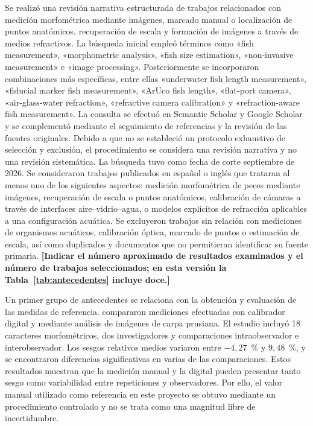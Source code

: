 \documentclass{report}
\newcommand{\pend}[1]{\textbf{[#1]}}
\begin{document}
Se realizó una revisión narrativa estructurada de trabajos relacionados con medición morfométrica mediante imágenes, marcado manual o localización de puntos anatómicos, recuperación de escala y formación de imágenes a través de medios refractivos. La búsqueda inicial empleó términos como «fish measurement», «morphometric analysis», «fish size estimation», «non-invasive measurement» e «image processing». Posteriormente se incorporaron combinaciones más específicas, entre ellas «underwater fish length measurement», «fiducial marker fish measurement», «ArUco fish length», «flat-port camera», «air-glass-water refraction», «refractive camera calibration» y «refraction-aware fish measurement». La consulta se efectuó en Semantic Scholar y Google Scholar y se complementó mediante el seguimiento de referencias y la revisión de las fuentes originales. Debido a que no se estableció un protocolo exhaustivo de selección y exclusión, el procedimiento se considera una revisión narrativa y no una revisión sistemática. La búsqueda tuvo como fecha de corte septiembre de 2026. Se consideraron trabajos publicados en español o inglés que trataran al menos uno de los siguientes aspectos: medición morfométrica de peces mediante imágenes, recuperación de escala o puntos anatómicos, calibración de cámaras a través de interfaces aire--vidrio--agua, o modelos explícitos de refracción aplicables a una configuración acuática. Se excluyeron trabajos sin relación con mediciones de organismos acuáticos, calibración óptica, marcado de puntos o estimación de escala, así como duplicados y documentos que no permitieran identificar su fuente primaria. \pend{Indicar el número aproximado de resultados examinados y el número de trabajos seleccionados; en esta versión la Tabla~\ref{tab:antecedentes} incluye doce.}

Un primer grupo de antecedentes se relaciona con la obtención y evaluación de las medidas de referencia. \textcite{Petrtyl2014} compararon mediciones efectuadas con calibrador digital y mediante análisis de imágenes de carpa prusiana. El estudio incluyó 18 caracteres morfométricos, dos investigadores y comparaciones intraobservador e interobservador. Los sesgos relativos medios variaron entre $-4{,}27$~\% y $9{,}48$~\%, y se encontraron diferencias significativas en varias de las comparaciones. Estos resultados muestran que la medición manual y la digital pueden presentar tanto sesgo como variabilidad entre repeticiones y observadores. Por ello, el valor manual utilizado como referencia en este proyecto se obtuvo mediante un procedimiento controlado y no se trata como una magnitud libre de incertidumbre.
\end{document}
